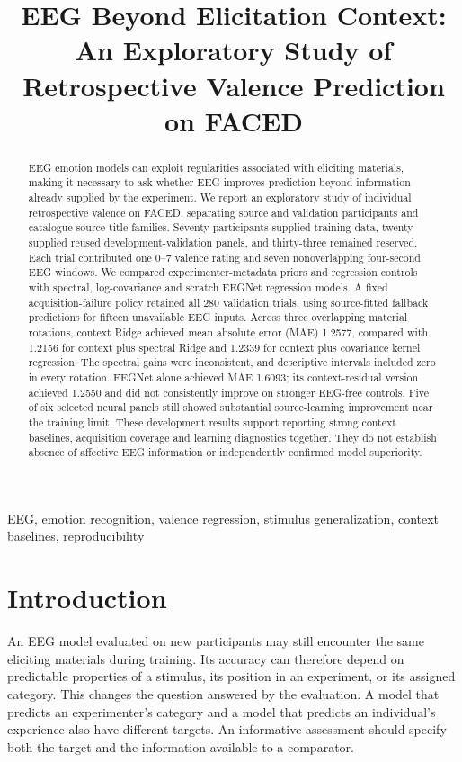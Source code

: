 \documentclass[conference]{IEEEtran}
\title{EEG Beyond Elicitation Context: An Exploratory Study of Retrospective Valence Prediction on FACED}
\author{\IEEEauthorblockN{Muhammad Wasif Shakeel and Muhammad Muntazar}
\IEEEauthorblockA{School of Electrical Engineering and Computer Science\\
National University of Sciences and Technology (NUST), Islamabad, Pakistan\\
mshakeel.bsds23seecs@seecs.edu.pk,\quad mmuntazar.bsds23seecs@seecs.edu.pk}}
\begin{document}
\maketitle

\begin{abstract}
EEG emotion models can exploit regularities associated with eliciting materials, making it necessary to ask whether EEG improves prediction beyond information already supplied by the experiment. We report an exploratory study of individual retrospective valence on FACED, separating source and validation participants and catalogue source-title families. Seventy participants supplied training data, twenty supplied reused development-validation panels, and thirty-three remained reserved. Each trial contributed one 0--7 valence rating and seven nonoverlapping four-second EEG windows. We compared experimenter-metadata priors and regression controls with spectral, log-covariance and scratch EEGNet regression models. A fixed acquisition-failure policy retained all 280 validation trials, using source-fitted fallback predictions for fifteen unavailable EEG inputs. Across three overlapping material rotations, context Ridge achieved mean absolute error (MAE) 1.2577, compared with 1.2156 for context plus spectral Ridge and 1.2339 for context plus covariance kernel regression. The spectral gains were inconsistent, and descriptive intervals included zero in every rotation. EEGNet alone achieved MAE 1.6093; its context-residual version achieved 1.2550 and did not consistently improve on stronger EEG-free controls. Five of six selected neural panels still showed substantial source-learning improvement near the training limit. These development results support reporting strong context baselines, acquisition coverage and learning diagnostics together. They do not establish absence of affective EEG information or independently confirmed model superiority.
\end{abstract}

\begin{IEEEkeywords}
EEG, emotion recognition, valence regression, stimulus generalization, context baselines, reproducibility
\end{IEEEkeywords}

\section{Introduction}
An EEG model evaluated on new participants may still encounter the same eliciting materials during training. Its accuracy can therefore depend on predictable properties of a stimulus, its position in an experiment, or its assigned category. This changes the question answered by the evaluation. A model that predicts an experimenter's category and a model that predicts an individual's experience also have different targets. An informative assessment should specify both the target and the information available to a comparator.
\end{document}
